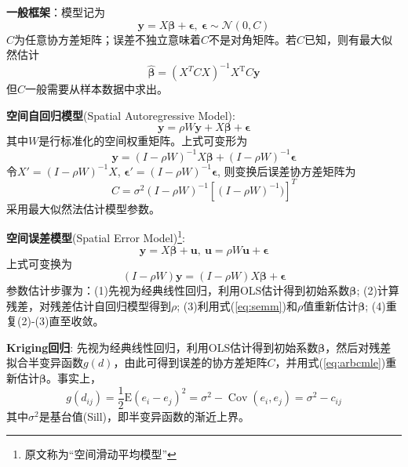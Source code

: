 \par \textbf{一般框架}：模型记为
\begin{equation}
\mathbf{y}=X\boldsymbol{\beta}+\boldsymbol{\epsilon},\ \boldsymbol{\epsilon}\sim \mathcal{N}(0,C)
\end{equation}
$C$为任意协方差矩阵；误差不独立意味着$C$不是对角矩阵。若$C$已知，则有最大似然估计
\begin{equation}
    \hat{\boldsymbol{\beta}}=(X^{T}CX)^{-1}X^{\mathrm{T}} C\mathbf{y}
\label{eq:arbcmle}
\end{equation}
但$C$一般需要从样本数据中求出。

\par \textbf{空间自回归模型}(Spatial Autoregressive Model):
\begin{equation}
\mathbf{y}=\rho W \mathbf{y}+ X\boldsymbol{\beta}+\boldsymbol{\epsilon}
\end{equation}
其中$W$是行标准化的空间权重矩阵。上式可变形为
\begin{equation}
    \mathbf{y}=(I-\rho W)^{-1}X\boldsymbol{\beta}+(I-\rho W)^{-1}\boldsymbol{\epsilon}
\end{equation}
令$X'=(I-\rho W)^{-1}X$, $\boldsymbol{\epsilon}'=(I-\rho W)^{-1}\boldsymbol{\epsilon}$, 则变换后误差协方差矩阵为
\begin{equation}
    C = \sigma^2 (I-\rho W)^{-1}[(I-\rho W)^{-1})]^T
\end{equation}
采用最大似然法估计模型参数。

\par \textbf{空间误差模型}(Spatial Error Model)\footnote{原文称为“空间滑动平均模型”}:
\begin{equation}
\mathbf{y}=X\boldsymbol{\beta}+\mathbf{u},\ \mathbf{u}=\rho W\mathbf{u}+\boldsymbol{\epsilon}
\end{equation}
上式可变换为
\begin{equation}
(I-\rho W)\mathbf{y}=(I-\rho W)X\boldsymbol{\beta}+\boldsymbol{\epsilon}
\label{eq:semm}
\end{equation}
参数估计步骤为：(1)先视为经典线性回归，利用OLS估计得到初始系数$\boldsymbol{\beta}$; (2)计算残差，对残差估计自回归模型得到$\rho$; (3)利用式(\ref{eq:semm})和$\rho$值重新估计$\boldsymbol{\beta}$; (4)重复(2)-(3)直至收敛。

\par \textbf{Kriging回归}: 先视为经典线性回归，利用OLS估计得到初始系数$\boldsymbol{\beta}$，然后对残差拟合半变异函数$g(d)$，由此可得到误差的协方差矩阵$C$，并用式(\ref{eq:arbcmle})重新估计$\boldsymbol{\beta}$。事实上，
\begin{equation}
    g(d_{ij})=\frac{1}{2}\mathrm{E}(e_i-e_j)^2=\sigma^2-\operatorname{Cov}(e_i,e_j)=\sigma^2-c_{ij}
\end{equation}
其中$\sigma^2$是基台值(Sill)，即半变异函数的渐近上界。


